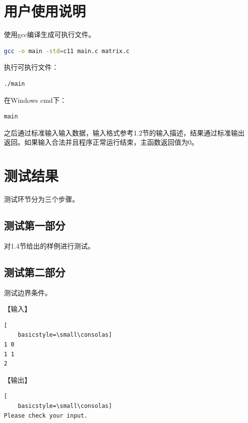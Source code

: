 \documentclass{article}
\begin{document}
\section{用户使用说明}

使用gcc编译生成可执行文件。

\begin{lstlisting}[language={bash},
    basicstyle=\small\consolas]
gcc -o main -std=c11 main.c matrix.c
\end{lstlisting}

执行可执行文件：

\begin{lstlisting}[language={bash},
    basicstyle=\small\consolas]
./main
\end{lstlisting}

在Windows cmd下：

\begin{lstlisting}[language={bash},
    basicstyle=\small\consolas]
main
\end{lstlisting}

之后通过标准输入输入数据，输入格式参考1.2节的输入描述，结果通过标准输出返回。如果输入合法并且程序正常运行结束，主函数返回值为0。

\section{测试结果}

测试环节分为三个步骤。

\subsection{测试第一部分}

对1.4节给出的样例进行测试。

\subsection{测试第二部分}

测试边界条件。

【输入】

\begin{lstlisting}[
    basicstyle=\small\consolas]
1 0
1 1
2
\end{lstlisting}

【输出】

\begin{lstlisting}[
    basicstyle=\small\consolas]
Please check your input.
\end{lstlisting}
\end{document}
